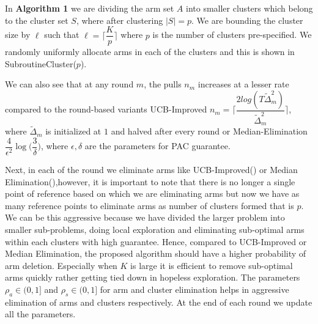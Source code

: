 In \textbf{Algorithm 1} we are dividing the arm set $A$ into smaller clusters which belong to the cluster set $S$, where after clustering $|S|=p$. We are bounding the cluster size by $\ell$ such that $\ell=\bigg\lceil \dfrac{K}{p} \bigg\rceil$ where $p$ is the number of clusters pre-specified. We randomly uniformly allocate arms in each of the clusters and this is shown in SubroutineCluster($p$).

We can also see that at any round $m$, the pulls $n_{m}$ increases at a lesser rate compared to the round-based variants UCB-Improved $n_{m}=\bigg\lceil \dfrac{2log(T\tilde{\Delta}_{m}^{2})}{\tilde{\Delta}_{m}^{2}} \bigg\rceil$, where $\tilde{\Delta}_{m}$ is initialized at $1$ and halved after every round or Median-Elimination $\dfrac{4}{\epsilon^{2}}\log\big(\dfrac{3}{\delta}\big)$, where $\epsilon,\delta$ are the parameters for PAC guarantee.

	Next, in each of the round we eliminate arms like UCB-Improved(\cite{auer2010ucb}) or Median Elimination(\cite{even2006action}),however, it is important to note that there is no longer a single point of reference based on which we are eliminating arms but now we have as many reference points to eliminate arms as number of clusters formed that is $p$. We can be this aggressive because we have divided the larger problem into smaller sub-problems, doing local exploration and eliminating sub-optimal arms within each clusters with high guarantee. Hence, compared to UCB-Improved or Median Elimination, the proposed algorithm should have a higher probability of arm deletion. Especially when $K$ is large it is efficient to remove sub-optimal arms quickly rather getting tied down in hopeless exploration. The parameters $\rho_{a}\in (0,1]$ and $\rho_{s}\in (0,1]$ for arm and cluster elimination helps in aggressive elimination of arms and clusters respectively. At the end of each round we update all the  parameters.

